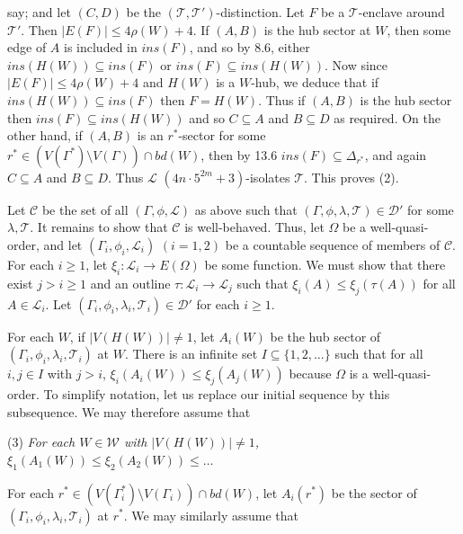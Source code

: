 \noindent say; and let $(C, D)$ be the $(\mathscr{T}, \mathscr{T}')$-distinction. Let $F$ be a $\mathscr{T}$-enclave around $\mathscr{T}'$. Then $|E(F)| \le 4\rho(W) + 4$. If $(A, B)$ is the hub sector at $W$, then some edge of $A$ is included in $ins(F)$, and so by 8.6, either $ins(H(W)) \subseteq ins(F)$ or $ins(F) \subseteq ins(H(W))$. Now since $|E(F)| \le 4\rho(W) + 4$ and $H(W)$ is a $W$-hub, we deduce that if $ins(H(W)) \subseteq ins(F)$ then $F = H(W)$. Thus if $(A, B)$ is the hub sector then $ins(F) \subseteq ins(H(W))$ and so $C \subseteq A$ and $B \subseteq D$ as required. On the other hand, if $(A, B)$ is an $r^*$-sector for some $r^* \in (V(\Gamma^*) \setminus V(\Gamma)) \cap bd(W)$, then by 13.6 $ins(F) \subseteq \Delta_{r^*}$, and again $C \subseteq A$ and $B \subseteq D$. Thus $\mathscr{L}$ $(4n \cdot 5^{2m} + 3)$-isolates $\mathscr{T}$. This proves (2).

Let $\mathscr{C}$ be the set of all $(\Gamma, \phi, \mathscr{L})$ as above such that $(\Gamma, \phi, \lambda, \mathscr{T}) \in \mathscr{D}'$ for some $\lambda, \mathscr{T}$. It remains to show that $\mathscr{C}$ is well-behaved. Thus, let $\Omega$ be a well-quasi-order, and let $(\Gamma_i, \phi_i, \mathscr{L}_i)$ $(i = 1, 2)$ be a countable sequence of members of $\mathscr{C}$. For each $i \ge 1$, let $\xi_i : \mathscr{L}_i \to E(\Omega)$ be some function. We must show that there exist $j > i \ge 1$ and an outline $\tau : \mathscr{L}_i \to \mathscr{L}_j$ such that $\xi_i(A) \le \xi_j(\tau(A))$ for all $A \in \mathscr{L}_i$. Let $(\Gamma_i, \phi_i, \lambda_i, \mathscr{T}_i) \in \mathscr{D}'$ for each $i \ge 1$.

For each $W$, if $|V(H(W))| \ne 1$, let $A_i(W)$ be the hub sector of $(\Gamma_i, \phi_i, \lambda_i, \mathscr{T}_i)$ at $W$. There is an infinite set $I \subseteq \{1, 2, \dots\}$ such that for all $i, j \in I$ with $j > i$, $\xi_i(A_i(W)) \le \xi_j(A_j(W))$ because $\Omega$ is a well-quasi-order. To simplify notation, let us replace our initial sequence by this subsequence. We may therefore assume that

\hspace*{12pt}(3) \textit{For each $W \in \mathscr{W}$ with $|V(H(W))| \ne 1$, $\xi_1(A_1(W)) \le \xi_2(A_2(W)) \le \dots$}

For each $r^* \in (V(\Gamma_i^*) \setminus V(\Gamma_i)) \cap bd(W)$, let $A_i(r^*)$ be the sector of $(\Gamma_i, \phi_i, \lambda_i, \mathscr{T}_i)$ at $r^*$. We may similarly assume that

